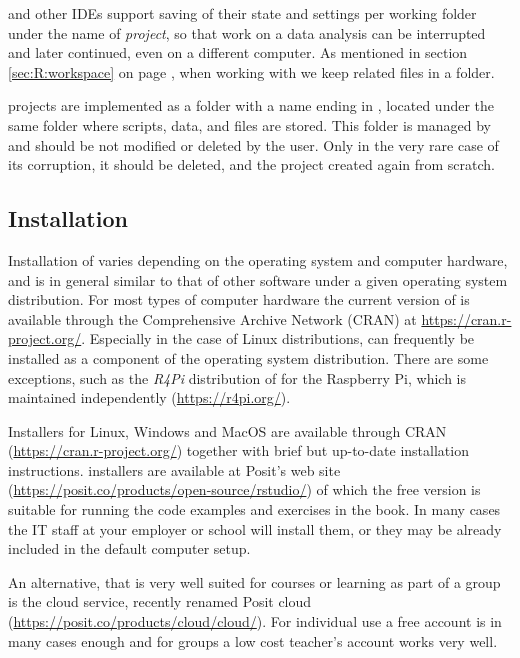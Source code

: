\documentclass[krantz2]{krantz}\usepackage{knitr}
\begin{document}
\RStudio and other IDEs support saving of their state and settings per working folder under the name of \emph{project}, so that work on a data analysis can be interrupted and later continued, even on a different computer. As mentioned in section \ref{sec:R:workspace} on page \pageref{sec:R:workspace}, when working with \Rlang we keep related files in a folder. 

\begin{warningbox}
\RStudio projects are implemented as a folder with a name ending in , located under the same folder where scripts, data,  and  files are stored. This folder is managed by \RStudio and should be not modified or deleted by the user. Only in the very rare case of its corruption, it should be deleted, and the project created again from scratch.
\end{warningbox}
 

\subsection{Installation}

Installation of \Rpgrm varies depending on the operating system and computer hardware, and is in general similar to that of other software under a given operating system distribution. For most types of computer hardware the current version of \Rpgrm is available through the Comprehensive \Rlang Archive Network (CRAN) at \url{https://cran.r-project.org/}. Especially in the case of Linux distributions, \Rpgrm can frequently be installed as a component of the operating system distribution. There are some exceptions, such as the \textsl{R4Pi} distribution of \Rpgrm for the Raspberry Pi, which is maintained independently (\url{https://r4pi.org/}).

Installers for Linux, Windows and MacOS are available through CRAN (\url{https://cran.r-project.org/}) together with brief but up-to-date installation instructions. \RStudio installers are available at Posit's web site (\url{https://posit.co/products/open-source/rstudio/}) of which the free version is suitable for running the code examples and exercises in the book. In many cases the IT staff at your employer or school will install them, or they may be already included in the default computer setup.

An alternative, that is very well suited for courses or learning as part of a group is the \RStudio cloud service, recently renamed Posit cloud (\url{https://posit.co/products/cloud/cloud/}). For individual use a free account is in many cases enough and for groups a low cost teacher's account works very well.
\end{document}
